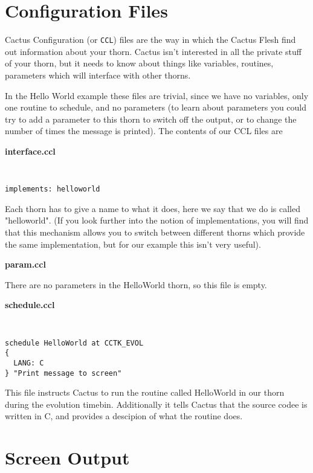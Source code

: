 \documentclass{article}
\begin{document}
\section{Configuration Files}

Cactus Configuration (or {\tt CCL}) files are the way in which the
Cactus Flesh find out information about your thorn. Cactus isn't
interested in all the private stuff of your thorn, but it needs to
know about things like variables, routines, parameters which will
interface with other thorns. 

In the Hello World example these files are trivial, since we have no
variables, only one routine to schedule, and no parameters (to learn
about parameters you could try to add a parameter to this thorn to
switch off the output, or to change the number of times the message is
printed). The contents of our CCL files are

\begin{description}

\item{\bf interface.ccl} 

{\tt
\begin{verbatim}
implements: helloworld
\end{verbatim}
}

Each thorn has to give a name to what it does, here we say that we do
is called "helloworld". (If you look further into the notion of
implementations, you will find that this mechanism allows you to
switch between different thorns which provide the same implementation,
but for our example this isn't very useful).

\item{\bf param.ccl} 

There are no parameters in the HelloWorld thorn, so this file is empty.

\item{\bf schedule.ccl}

{\tt
\begin{verbatim}
schedule HelloWorld at CCTK_EVOL
{
  LANG: C
} "Print message to screen"
\end{verbatim}
}

This file instructs Cactus to run the routine called HelloWorld in our
thorn during the evolution timebin. Additionally it tells Cactus that
the source codee is written in C, and provides a descipion of what the
routine does. 

\end{description}

\section{Screen Output}
\end{document}
